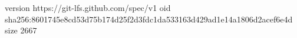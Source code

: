 version https://git-lfs.github.com/spec/v1
oid sha256:8601745e8cd53d75b174d25f2d3fdc1da533163d429ad1e14a1806d2acef6e4d
size 2667
